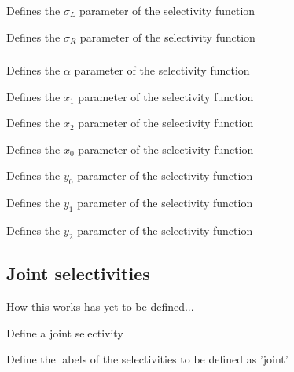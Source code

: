  {Defines the $\sigma_L$ parameter of the selectivity function}

 {Defines the $\sigma_R$ parameter of the selectivity function}

\subsubsection[Double-exponential]{}

 {Defines the $\alpha$ parameter of the selectivity function}

 {Defines the $x_1$ parameter of the selectivity function}

 {Defines the $x_2$ parameter of the selectivity function}

 {Defines the $x_0$ parameter of the selectivity function}

 {Defines the $y_0$ parameter of the selectivity function}

 {Defines the $y_1$ parameter of the selectivity function}

 {Defines the $y_2$ parameter of the selectivity function}

\subsection{Joint selectivities}

How this works has yet to be defined...

 {Define a joint selectivity}

 {Define the labels of the selectivities to be defined as 'joint'}
